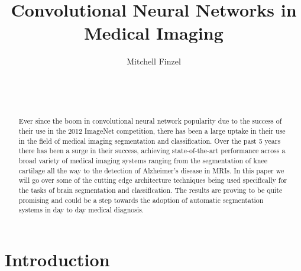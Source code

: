\documentclass{sig-alternate}
\begin{document}

\title{Convolutional Neural Networks in Medical Imaging}


\author{
\alignauthor
Mitchell Finzel\\
	\\
	\\
	\\
}

\maketitle
\begin{abstract}

Ever since the boom in convolutional neural network popularity due to the success of their use in the 2012 ImageNet competition, there has been a large uptake in their use in the field of medical imaging segmentation and classification. Over the past 5 years there has been a surge in their success, achieving state-of-the-art performance across a broad variety of medical imaging systems ranging from the segmentation of knee cartilage all the way to the detection of Alzheimer's disease in MRIs. In this paper we will go over some of the cutting edge architecture techniques being used specifically for the tasks of brain segmentation and classification. The results are proving to be quite promising and could be a step towards the adoption of automatic segmentation systems in day to day medical diagnosis.

\end{abstract}


\section{Introduction}
\label{sec:introduction}

~\cite{Havaei:2017}
\end{document}
